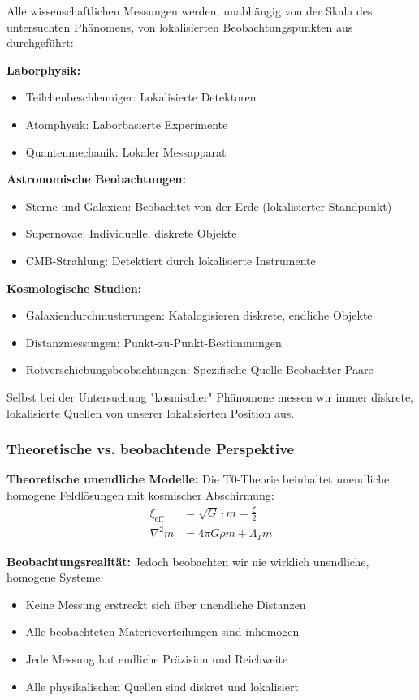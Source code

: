 \documentclass[12pt,a4paper]{article}
\begin{document}
Alle wissenschaftlichen Messungen werden, unabhängig von der Skala des untersuchten Phänomens, von lokalisierten Beobachtungspunkten aus durchgeführt:

\textbf{Laborphysik:}
\begin{itemize}
	\item Teilchenbeschleuniger: Lokalisierte Detektoren
	\item Atomphysik: Laborbasierte Experimente
	\item Quantenmechanik: Lokaler Messapparat
\end{itemize}

\textbf{Astronomische Beobachtungen:}
\begin{itemize}
	\item Sterne und Galaxien: Beobachtet von der Erde (lokalisierter Standpunkt)
	\item Supernovae: Individuelle, diskrete Objekte  
	\item CMB-Strahlung: Detektiert durch lokalisierte Instrumente
\end{itemize}

\textbf{Kosmologische Studien:}
\begin{itemize}
	\item Galaxiendurchmusterungen: Katalogisieren diskrete, endliche Objekte
	\item Distanzmessungen: Punkt-zu-Punkt-Bestimmungen
	\item Rotverschiebungsbeobachtungen: Spezifische Quelle-Beobachter-Paare
\end{itemize}

Selbst bei der Untersuchung "kosmischer" Phänomene messen wir immer diskrete, lokalisierte Quellen von unserer lokalisierten Position aus.

\subsubsection{Theoretische vs. beobachtende Perspektive}
\label{subsubsec:theoretical_vs_observational}

\textbf{Theoretische unendliche Modelle:}
Die T0-Theorie beinhaltet unendliche, homogene Feldlösungen mit kosmischer Abschirmung:
\begin{align}
	\xi_{\text{eff}} &= \sqrt{G} \cdot m = \frac{\xi}{2} \\
	\nabla^2 m &= 4\pi G \rho m + \Lambda_T m
\end{align}

\textbf{Beobachtungsrealität:}
Jedoch beobachten wir nie wirklich unendliche, homogene Systeme:
\begin{itemize}
	\item Keine Messung erstreckt sich über unendliche Distanzen
	\item Alle beobachteten Materieverteilungen sind inhomogen
	\item Jede Messung hat endliche Präzision und Reichweite
	\item Alle physikalischen Quellen sind diskret und lokalisiert
\end{itemize}
\end{document}
